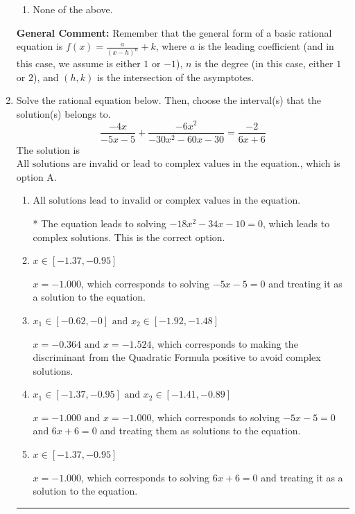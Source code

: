 \documentclass{extbook}[14pt]
\newcommand{\litem}[1]{\item #1

\rule{\textwidth}{0.4pt}}
\begin{document}
\begin{enumerate}
{\begin{enumerate}[label=\Alph*.]
\item None of the above.\end{enumerate}
\textbf{General Comment:} Remember that the general form of a basic rational equation is $ f(x) = \frac{a}{(x-h)^n} + k$, where $a$ is the leading coefficient (and in this case, we assume is either $1$ or $-1$), $n$ is the degree (in this case, either $1$ or $2$), and $(h, k)$ is the intersection of the asymptotes.
}
\litem{
Solve the rational equation below. Then, choose the interval(s) that the solution(s) belongs to.
\[ \frac{-4x}{-5x -5} + \frac{-6x^{2}}{-30x^{2} -60 x -30} = \frac{-2}{6x + 6} \]The solution is \( \text{All solutions are invalid or lead to complex values in the equation.} \), which is option A.\begin{enumerate}[label=\Alph*.]
\item \( \text{All solutions lead to invalid or complex values in the equation.} \)

* The equation leads to solving $-18x^{2} -34 x -10=0$, which leads to complex solutions. This is the correct option.
\item \( x \in [-1.37,-0.95] \)

$x = -1.000$, which corresponds to solving $-5x -5 = 0$ and treating it as a solution to the equation.
\item \( x_1 \in [-0.62, -0] \text{ and } x_2 \in [-1.92,-1.48] \)

$x = -0.364 \text{ and } x = -1.524$, which corresponds to making the discriminant from the Quadratic Formula positive to avoid complex solutions.
\item \( x_1 \in [-1.37, -0.95] \text{ and } x_2 \in [-1.41,-0.89] \)

$x = -1.000 \text{ and } x = -1.000$, which corresponds to solving $-5x -5 = 0$ and $6x + 6 = 0$ and treating them as solutions to the equation.
\item \( x \in [-1.37,-0.95] \)

$x = -1.000$, which corresponds to solving $6x + 6 = 0$ and treating it as a solution to the equation.
\end{enumerate}

}
\end{enumerate}
\end{document}
